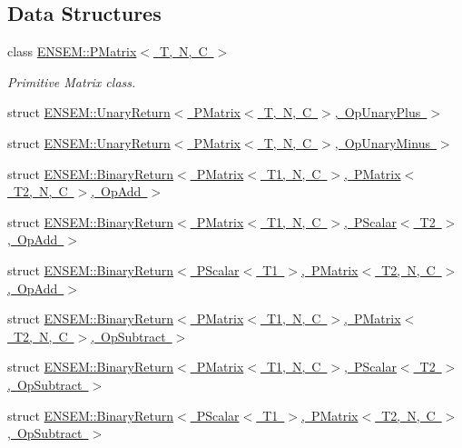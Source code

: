 \subsection*{Data Structures}
\begin{DoxyCompactItemize}
\item 
class \mbox{\hyperlink{classENSEM_1_1PMatrix}{E\+N\+S\+E\+M\+::\+P\+Matrix$<$ T, N, C $>$}}
\begin{DoxyCompactList}\small\item\em Primitive Matrix class. \end{DoxyCompactList}\item 
struct \mbox{\hyperlink{structENSEM_1_1UnaryReturn_3_01PMatrix_3_01T_00_01N_00_01C_01_4_00_01OpUnaryPlus_01_4}{E\+N\+S\+E\+M\+::\+Unary\+Return$<$ P\+Matrix$<$ T, N, C $>$, Op\+Unary\+Plus $>$}}
\item 
struct \mbox{\hyperlink{structENSEM_1_1UnaryReturn_3_01PMatrix_3_01T_00_01N_00_01C_01_4_00_01OpUnaryMinus_01_4}{E\+N\+S\+E\+M\+::\+Unary\+Return$<$ P\+Matrix$<$ T, N, C $>$, Op\+Unary\+Minus $>$}}
\item 
struct \mbox{\hyperlink{structENSEM_1_1BinaryReturn_3_01PMatrix_3_01T1_00_01N_00_01C_01_4_00_01PMatrix_3_01T2_00_01N_00_01C_01_4_00_01OpAdd_01_4}{E\+N\+S\+E\+M\+::\+Binary\+Return$<$ P\+Matrix$<$ T1, N, C $>$, P\+Matrix$<$ T2, N, C $>$, Op\+Add $>$}}
\item 
struct \mbox{\hyperlink{structENSEM_1_1BinaryReturn_3_01PMatrix_3_01T1_00_01N_00_01C_01_4_00_01PScalar_3_01T2_01_4_00_01OpAdd_01_4}{E\+N\+S\+E\+M\+::\+Binary\+Return$<$ P\+Matrix$<$ T1, N, C $>$, P\+Scalar$<$ T2 $>$, Op\+Add $>$}}
\item 
struct \mbox{\hyperlink{structENSEM_1_1BinaryReturn_3_01PScalar_3_01T1_01_4_00_01PMatrix_3_01T2_00_01N_00_01C_01_4_00_01OpAdd_01_4}{E\+N\+S\+E\+M\+::\+Binary\+Return$<$ P\+Scalar$<$ T1 $>$, P\+Matrix$<$ T2, N, C $>$, Op\+Add $>$}}
\item 
struct \mbox{\hyperlink{structENSEM_1_1BinaryReturn_3_01PMatrix_3_01T1_00_01N_00_01C_01_4_00_01PMatrix_3_01T2_00_01N_00_01C_01_4_00_01OpSubtract_01_4}{E\+N\+S\+E\+M\+::\+Binary\+Return$<$ P\+Matrix$<$ T1, N, C $>$, P\+Matrix$<$ T2, N, C $>$, Op\+Subtract $>$}}
\item 
struct \mbox{\hyperlink{structENSEM_1_1BinaryReturn_3_01PMatrix_3_01T1_00_01N_00_01C_01_4_00_01PScalar_3_01T2_01_4_00_01OpSubtract_01_4}{E\+N\+S\+E\+M\+::\+Binary\+Return$<$ P\+Matrix$<$ T1, N, C $>$, P\+Scalar$<$ T2 $>$, Op\+Subtract $>$}}
\item 
struct \mbox{\hyperlink{structENSEM_1_1BinaryReturn_3_01PScalar_3_01T1_01_4_00_01PMatrix_3_01T2_00_01N_00_01C_01_4_00_01OpSubtract_01_4}{E\+N\+S\+E\+M\+::\+Binary\+Return$<$ P\+Scalar$<$ T1 $>$, P\+Matrix$<$ T2, N, C $>$, Op\+Subtract $>$}}

\end{DoxyCompactItemize}

